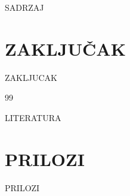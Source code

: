 \documentclass[12pt,a4paper]{article}
\begin{document}
{{SADRZAJ}}

\section{ZAKLJUČAK}
{{ZAKLJUCAK}}

\newpage
\begin{thebibliography}{99}
{{LITERATURA}}
\end{thebibliography}

\newpage
\section*{PRILOZI}
{{PRILOZI}}
\end{document}
